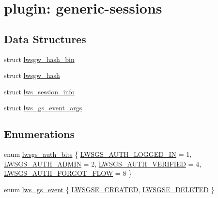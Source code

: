 \hypertarget{group__generic-sessions}{}\section{plugin\+: generic-\/sessions}
\label{group__generic-sessions}
\subsection*{Data Structures}
\begin{DoxyCompactItemize}
\item 
struct \hyperlink{structlwsgw__hash__bin}{lwsgw\+\_\+hash\+\_\+bin}
\item 
struct \hyperlink{structlwsgw__hash}{lwsgw\+\_\+hash}
\item 
struct \hyperlink{structlws__session__info}{lws\+\_\+session\+\_\+info}
\item 
struct \hyperlink{structlws__gs__event__args}{lws\+\_\+gs\+\_\+event\+\_\+args}
\end{DoxyCompactItemize}
\subsection*{Enumerations}
\begin{DoxyCompactItemize}
\item 
enum \hyperlink{group__generic-sessions_ga7c2dc7bfb4ccb91c5d771f9e9ea237e1}{lwsgs\+\_\+auth\+\_\+bits} \{ \hyperlink{group__generic-sessions_gga7c2dc7bfb4ccb91c5d771f9e9ea237e1a81e63075115dedd150265d81b8f7fa57}{L\+W\+S\+G\+S\+\_\+\+A\+U\+T\+H\+\_\+\+L\+O\+G\+G\+E\+D\+\_\+\+IN} = 1, 
\hyperlink{group__generic-sessions_gga7c2dc7bfb4ccb91c5d771f9e9ea237e1a0657a9e846814781b128c397fe4b10bf}{L\+W\+S\+G\+S\+\_\+\+A\+U\+T\+H\+\_\+\+A\+D\+M\+IN} = 2, 
\hyperlink{group__generic-sessions_gga7c2dc7bfb4ccb91c5d771f9e9ea237e1a5a607e4668d20cadada62c4b8007f887}{L\+W\+S\+G\+S\+\_\+\+A\+U\+T\+H\+\_\+\+V\+E\+R\+I\+F\+I\+ED} = 4, 
\hyperlink{group__generic-sessions_gga7c2dc7bfb4ccb91c5d771f9e9ea237e1a2cd8fb86e3b85c106e7711c03f0ddd0a}{L\+W\+S\+G\+S\+\_\+\+A\+U\+T\+H\+\_\+\+F\+O\+R\+G\+O\+T\+\_\+\+F\+L\+OW} = 8
 \}
\item 
enum \hyperlink{group__generic-sessions_gaa93946b3d921072209d5cd8cdfa5332e}{lws\+\_\+gs\+\_\+event} \{ \hyperlink{group__generic-sessions_ggaa93946b3d921072209d5cd8cdfa5332ea596010a165bf13473c5eea3a34cd4308}{L\+W\+S\+G\+S\+E\+\_\+\+C\+R\+E\+A\+T\+ED}, 
\hyperlink{group__generic-sessions_ggaa93946b3d921072209d5cd8cdfa5332ead908cdc5689c5d22c9d3c8934e94dcde}{L\+W\+S\+G\+S\+E\+\_\+\+D\+E\+L\+E\+T\+ED}
 \}
\end{DoxyCompactItemize}


